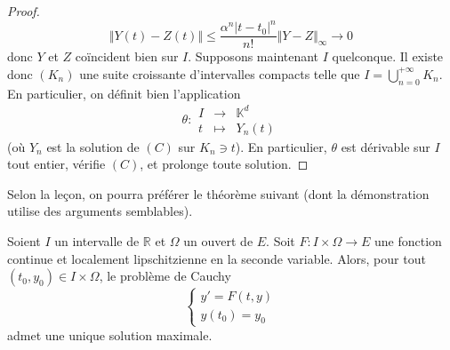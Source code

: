 \begin{proof}
    \[ \Vert Y(t) - Z(t) \Vert \leq \frac{\alpha^n |t-t_0|^n}{n!} \Vert Y-Z \Vert_{\infty} \longrightarrow 0 \]
    donc $Y$ et $Z$ coïncident bien sur $I$.
    \newpar
    Supposons maintenant $I$ quelconque. Il existe donc $(K_n)$ une suite croissante d'intervalles compacts telle que $I = \bigcup_{n = 0}^{+\infty} K_n$. En particulier, on définit bien l'application
    \[
    \theta :
    \begin{array}{ccc}
      I &\rightarrow& \mathbb{K}^d \\
      t &\mapsto& Y_n(t)
    \end{array}
    \]
    (où $Y_n$ est la solution de $(C)$ sur $K_n \ni t$). En particulier, $\theta$ est dérivable sur $I$ tout entier, vérifie $(C)$, et prolonge toute solution.
  \end{proof}

  Selon la leçon, on pourra préférer le théorème suivant (dont la démonstration utilise des arguments semblables).


  \begin{theorem}
    Soient $I$ un intervalle de $\mathbb{R}$ et $\Omega$ un ouvert de $E$. Soit $F : I \times \Omega \rightarrow E$ une fonction continue et localement lipschitzienne en la seconde variable. Alors, pour tout $(t_0, y_0) \in I \times \Omega$, le problème de Cauchy
    \[ \begin{cases} y'=F(t,y) \\ y(t_0) = y_0 \end{cases} \tag{$C$} \]
    admet une unique solution maximale.
  \end{theorem}

